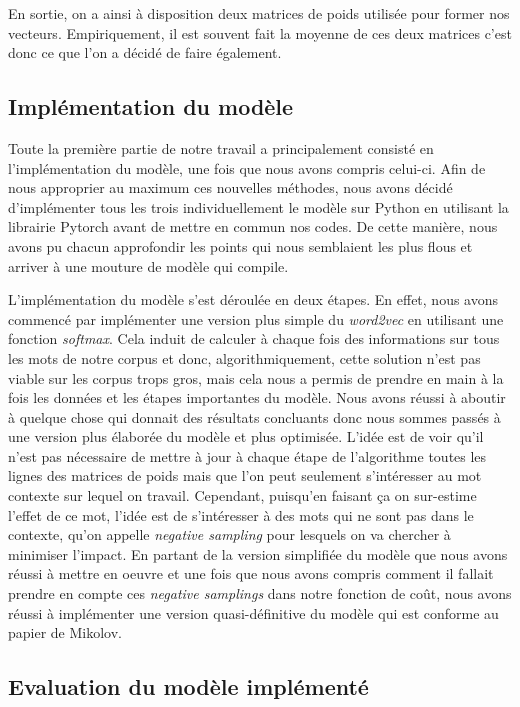 \documentclass[11pt,french,french]{article}
\begin{document}
En sortie, on a ainsi à disposition deux matrices de poids utilisée pour
former nos vecteurs. Empiriquement, il est souvent fait la moyenne de
ces deux matrices c'est donc ce que l'on a décidé de faire également.

\subsection{Implémentation du
modèle}\label{impluxe9mentation-du-moduxe8le}

Toute la première partie de notre travail a principalement consisté en
l'implémentation du modèle, une fois que nous avons compris celui-ci.
Afin de nous approprier au maximum ces nouvelles méthodes, nous avons
décidé d'implémenter tous les trois individuellement le modèle sur
Python en utilisant la librairie Pytorch avant de mettre en commun nos
codes. De cette manière, nous avons pu chacun approfondir les points qui
nous semblaient les plus flous et arriver à une mouture de modèle qui
compile.

L'implémentation du modèle s'est déroulée en deux étapes. En effet, nous
avons commencé par implémenter une version plus simple du
\emph{word2vec} en utilisant une fonction \emph{softmax}. Cela induit de
calculer à chaque fois des informations sur tous les mots de notre
corpus et donc, algorithmiquement, cette solution n'est pas viable sur
les corpus trops gros, mais cela nous a permis de prendre en main à la
fois les données et les étapes importantes du modèle. Nous avons réussi
à aboutir à quelque chose qui donnait des résultats concluants donc nous
sommes passés à une version plus élaborée du modèle et plus optimisée.
L'idée est de voir qu'il n'est pas nécessaire de mettre à jour à chaque
étape de l'algorithme toutes les lignes des matrices de poids mais que
l'on peut seulement s'intéresser au mot contexte sur lequel on travail.
Cependant, puisqu'en faisant ça on sur-estime l'effet de ce mot, l'idée
est de s'intéresser à des mots qui ne sont pas dans le contexte, qu'on
appelle \emph{negative sampling} pour lesquels on va chercher à
minimiser l'impact. En partant de la version simplifiée du modèle que
nous avons réussi à mettre en oeuvre et une fois que nous avons compris
comment il fallait prendre en compte ces \emph{negative samplings} dans
notre fonction de coût, nous avons réussi à implémenter une version
quasi-définitive du modèle qui est conforme au papier de Mikolov.

\subsection{Evaluation du modèle
implémenté}\label{evaluation-du-moduxe8le-impluxe9mentuxe9}
\end{document}
